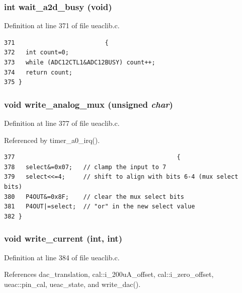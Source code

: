 \subsubsection{\setlength{\rightskip}{0pt plus 5cm}int wait\_\-a2d\_\-busy (void)}\label{ueaclib_8h_a17}




Definition at line 371 of file ueaclib.c.

\footnotesize\begin{verbatim}371                         {
372   int count=0;
373   while (ADC12CTL1&ADC12BUSY) count++;
374   return count;
375 }
\end{verbatim}\normalsize 


\subsubsection{\setlength{\rightskip}{0pt plus 5cm}void write\_\-analog\_\-mux (unsigned {\em char})}\label{ueaclib_8h_a18}




Definition at line 377 of file ueaclib.c.

Referenced by timer\_\-a0\_\-irq().

\footnotesize\begin{verbatim}377                                             {
378   select&=0x07;   // clamp the input to 7 
379   select<<=4;     // shift to align with bits 6-4 (mux select bits)
380   P4OUT&=0x8F;    // clear the mux select bits
381   P4OUT|=select;  // "or" in the new select value
382 }
\end{verbatim}\normalsize 


\subsubsection{\setlength{\rightskip}{0pt plus 5cm}void write\_\-current (int, int)}\label{ueaclib_8h_a13}




Definition at line 384 of file ueaclib.c.

References dac\_\-translation, cal::i\_\-200u\-A\_\-offset, cal::i\_\-zero\_\-offset, ueac::pin\_\-cal, ueac\_\-state, and write\_\-dac().

